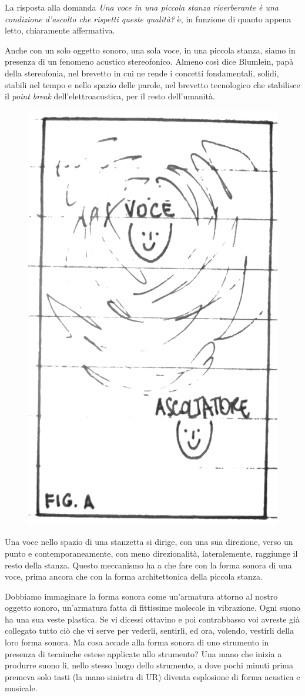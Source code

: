 La risposta alla domanda \emph{Una voce in una piccola stanza riverberante è una
condizione d'ascolto che rispetti queste qualità?} è, in funzione di quanto
appena letto, chiaramente affermativa.

Anche con un solo oggetto sonoro, una sola voce, in una piccola stanza, siamo in
presenza di un fenomeno acustico stereofonico. Almeno così dice Blumlein, papà
della stereofonia, nel brevetto in cui ne rende i concetti fondamentali, solidi,
stabili nel tempo e nello spazio delle parole, nel brevetto tecnologico che stabilisce
il \emph{point break} dell'elettroacustica, per il resto dell'umanità.

\begin{figure}[h]
\begin{center}
  \includegraphics[width=.48\linewidth]{CAPITOLI/1000/IMG/figa.png}
\label{ee:figa}
\end{center}
\end{figure}

Una voce nello spazio di una stanzetta si dirige, con una sua direzione, verso
un punto e contemporaneamente, con meno direzionalità, lateralemente, raggiunge
il resto della stanza. Questo meccanismo ha a che fare con la forma sonora di una
voce, prima ancora che con la forma architettonica della piccola stanza.

Dobbiamo immaginare la forma sonora come un'armatura attorno al nostro oggetto
sonoro, un'armatura fatta di fittissime molecole in vibrazione. Ogni suono ha una
sua veste plastica. Se vi dicessi ottavino e poi contrabbasso voi avreste già
collegato tutto ciò che vi serve per vederli, sentirli, ed ora, volendo, vestirli
della loro forma sonora. Ma cosa accade alla forma sonora di uno strumento in
presenza di tecninche estese applicate allo strumento? Una mano che inizia a produrre
suono li, nello stesso luogo dello strumento, a dove pochi minuti prima premeva
solo tasti (la mano  sinistra di UR) diventa esplosione di forma acustica e musicale.

